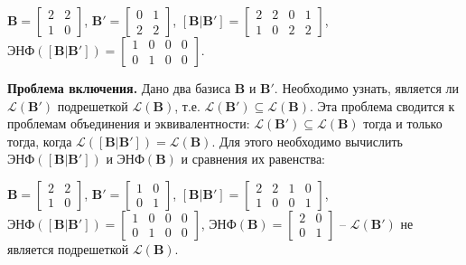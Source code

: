 $ \mathbf{B} = \left[\begin{array}{cccc}
2 & 2 \\
1 & 0
\end{array}\right] $, 
$ \mathbf{B}' = \left[\begin{array}{cccc}
0 & 1 \\
2 & 2
\end{array}\right] $, 
$ \left[\mathbf{B} | \mathbf{B}'\right] = \left[\begin{array}{cccc}
2 & 2 & 0 & 1 \\
1 & 0 & 2 & 2
\end{array}\right] $, 
$ \text{ЭНФ}(\left[\mathbf{B} | \mathbf{B}' \right]) = \left[\begin{array}{cccc}
1 & 0 & 0 & 0 \\
0 & 1 & 0 & 0
\end{array}\right] $.

\textbf{Проблема включения.} Дано два базиса $ \mathbf{B} $ и $ \mathbf{B}' $. Необходимо узнать, является ли $ \mathcal{L}(\mathbf{B}') $ подрешеткой $ \mathcal{L}(\mathbf{B}) $, т.е. $ \mathcal{L}(\mathbf{B}') \subseteq \mathcal{L}(\mathbf{B}) $. Эта проблема сводится к проблемам объединения и эквивалентности: $ \mathcal{L}(\mathbf{B}') \subseteq \mathcal{L}(\mathbf{B}) $ тогда и только тогда, когда $ \mathcal{L}(\left[\mathbf{B}|\mathbf{B}'\right]) = \mathcal{L}(\mathbf{B}) $. Для этого необходимо вычислить $ \text{ЭНФ}(\left[\mathbf{B} | \mathbf{B}' \right]) $ и $ \text{ЭНФ}(\mathbf{B}) $ и сравнения их равенства:

$ \mathbf{B} = \left[\begin{array}{cccc}
2 & 2 \\
1 & 0
\end{array}\right] $, 
$ \mathbf{B}' = \left[\begin{array}{cccc}
1 & 0 \\
0 & 1
\end{array}\right] $, 
$ \left[\mathbf{B} | \mathbf{B}'\right] = \left[\begin{array}{cccc}
2 & 2 & 1 & 0 \\
1 & 0 & 0 & 1
\end{array}\right] $, 
$ \text{ЭНФ}(\left[\mathbf{B} | \mathbf{B}' \right]) = \left[\begin{array}{cccc}
1 & 0 & 0 & 0 \\
0 & 1 & 0 & 0
\end{array}\right] $,
$ \text{ЭНФ}(\mathbf{B}) = \left[\begin{array}{cccc}
2 & 0 \\
0 & 1
\end{array}\right] $ -- $ \mathcal{L}(\mathbf{B}') $ не является подрешеткой $ \mathcal{L}(\mathbf{B}) $.


